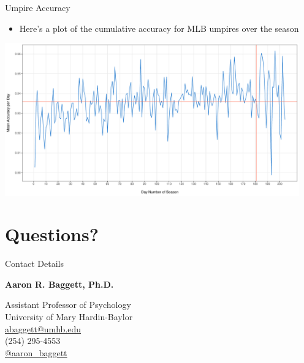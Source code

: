 \begin{frame}{Umpire Accuracy}

\begin{itemize}
\tightlist
\item
  Here's a plot of the cumulative accuracy for MLB umpires over the
  season
\end{itemize}

\vspace{-1mm}\begin{center}
\includegraphics[width = 5in]{../figs/ump_acc_season.pdf}
\end{center}

\end{frame}

\section{Questions?}\label{questions}

\begin{frame}{Contact Details}

\begin{center}
{\Large{\bf{Aaron R. Baggett, Ph.D.}}}

{\small{Assistant Professor of Psychology\\
University of Mary Hardin-Baylor\\
{\large{\faEnvelope}} \url{abaggett@umhb.edu}\\
{\large{\faPhone}} (254) 295-4553\\
{\large{\faTwitter}} \href{http://twitter.com/aaron_baggett}{@aaron\_baggett}}}
\end{center}

\end{frame}


